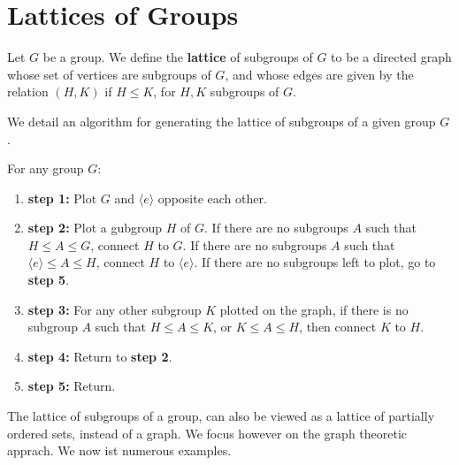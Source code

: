 \section{Lattices of Groups}
\label{section_2.5}

\begin{definition}
  Let $G$ be a group. We define the  \textbf{lattice} of subgroups of $G$ to
  be a directed graph whose set of vertices are subgroups of  $G$, and whose
  edges are given by the relation $(H,K)$ if $H \leq K$, for  $H,K$ subgroups
  of  $G$.
\end{definition}

We detail an algorithm for generating the lattice of subgroups of a given group
$G$.

\begin{algorithm}
  For any group $G$:
  \begin{enumerate}
    \item[] \textbf{step 1:} Plot $G$ and  $\langle e \rangle$ opposite each other.

    \item[] \textbf{step 2:} Plot a gubgroup $H$ of  $G$. If there are no
      subgroups $A$ such that $H \leq A \leq G$, connect  $H$ to  $G$. If
      there are no subgroups $A$ such that  $\langle e \rangle \leq A \leq H$,
      connect $H$ to  $\langle e \rangle$. If there are no subgroups left to
      plot, go to \textbf{step 5}.

    \item[] \textbf{step 3:} For any other subgroup $K$ plotted on the graph,
      if there is no subgroup $A$ such that  $H \leq A \leq K$, or $K \leq
      A \leq H$, then connect  $K$ to  $H$.

    \item[] \textbf{step 4:} Return to \textbf{step 2}.

    \item[] \textbf{step 5:} Return.
  \end{enumerate}
\end{algorithm}

The lattice of subgroups of a group, can also be viewed as a lattice of
partially ordered sets, instead of a graph. We focus however on the graph
theoretic apprach. We now ist numerous examples.

